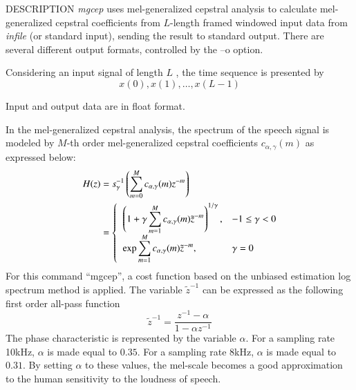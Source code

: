 \begin{synopsis}
\item[mgcep]   [ --a $A$ ] [ --g $G$ ] [ --c $C$ ] [ --m $M$ ] [ --l $L$ ] 
               [ --q $Q$ ] [ --o $O$ ]
\item[\ ~~~~~~~] [ --i $I$ ] [ --j $J$ ] [ --d $D$ ] [ --p $P$ ] [ --e $e$ ] [ --E $E$ ] [ --f $F$ ] 
                 [ {\em infile} ]
\end{synopsis}

\begin{qsection}{DESCRIPTION}
{\em mgcep} uses mel-generalized cepstral analysis 
to calculate mel-generalized cepstral coefficients 
from $L$-length framed windowed input data 
from {\em infile} (or standard input), 
sending the result to standard output. 
There are several different output formats,
controlled by the --o option.

Considering an  input signal of length $L$ ,
 the time sequence is presented by
\begin{displaymath}
  x(0),x(1),\dots,x(L-1)
\end{displaymath}

Input and output data are in float format.

In the mel-generalized cepstral analysis, the spectrum of the speech signal
is modeled by $M$-th order mel-generalized cepstral
coefficients $c_{\alpha, \gamma}(m)$
as expressed below:
\begin{align}
H(z) &= s_\gamma^{-1}\left(
        \sum_{m=0}^M c_{\alpha, \gamma}(m)z^{-m} \right) \notag \\
     &= \begin{cases} \;\; \displaystyle
        \left( 1+\gamma\sum_{m=1}^M c_{\alpha, \gamma}(m)\tilde{z}^{-m}
                \right)^{1/\gamma}, & -1 \leq \gamma < 0 \\
        \;\; \displaystyle \exp \sum_{m=1}^M c_{\alpha, \gamma}(m)\tilde{z}^{-m}, 
                & \gamma=0
        \end{cases} \notag
\end{align}
For this command ``mgcep'',
a cost function
based on the unbiased estimation log spectrum method is applied.
The variable $\tilde{z}^{-1}$ can be expressed as the following
first order all-pass function
\begin{displaymath}
\tilde{z}^{-1} = \frac{z^{-1}-\alpha}{1-\alpha z^{-1}}
\end{displaymath}
 The phase characteristic is represented by the variable $\alpha$.
For a sampling rate 10kHz, $\alpha$ is made equal to $0.35$.
For a sampling rate 8kHz, $\alpha$ is made equal to $0.31$.
By setting $\alpha$ to these values,
the mel-scale becomes a good approximation to the human
sensitivity to the loudness of speech.


\end{qsection}
